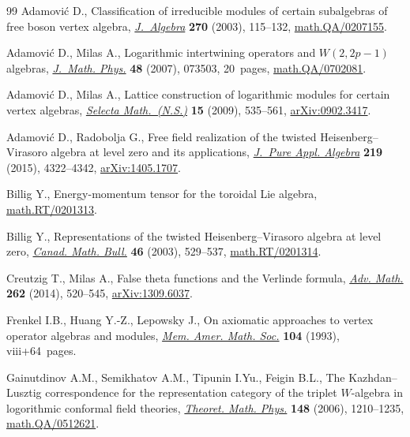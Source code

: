 \documentclass[11pt]{article}
\numberwithin{equation}{section}
\begin{document}
\begin{thebibliography}{99}
Adamovi{\'c} D., Classif\/ication of irreducible modules of certain subalgebras
 of free boson vertex algebra, \href{http://dx.doi.org/10.1016/j.jalgebra.2003.07.011}{\textit{J.~Algebra}} \textbf{270} (2003),
 115--132, \href{http://arxiv.org/abs/math.QA/0207155}{math.QA/0207155}.

Adamovi{\'c} D., Milas A., Logarithmic intertwining operators and {$W(2,2p-1)$}
 algebras, \href{http://dx.doi.org/10.1063/1.2747725}{\textit{J.~Math. Phys.}} \textbf{48} (2007), 073503, 20~pages,
 \href{http://arxiv.org/abs/math.QA/0702081}{math.QA/0702081}.

Adamovi{\'c} D., Milas A., Lattice construction of logarithmic modules for
 certain vertex algebras, \href{http://dx.doi.org/10.1007/s00029-009-0009-z}{\textit{Selecta Math.~(N.S.)}} \textbf{15} (2009),
 535--561, \href{http://arxiv.org/abs/0902.3417}{arXiv:0902.3417}.

Adamovi{\'c} D., Radobolja G., Free f\/ield realization of the twisted
 {H}eisenberg--{V}irasoro algebra at level zero and its applications,
 \href{http://dx.doi.org/10.1016/j.jpaa.2015.02.019}{\textit{J.~Pure Appl. Algebra}} \textbf{219} (2015), 4322--4342,
 \href{http://arxiv.org/abs/1405.1707}{arXiv:1405.1707}.

Billig Y., Energy-momentum tensor for the toroidal {L}ie algebra,
 \href{http://arxiv.org/abs/math.RT/0201313}{math.RT/0201313}.

Billig Y., Representations of the twisted {H}eisenberg--{V}irasoro algebra at
 level zero, \href{http://dx.doi.org/10.4153/CMB-2003-050-8}{\textit{Canad. Math. Bull.}} \textbf{46} (2003), 529--537,
 \href{http://arxiv.org/abs/math.RT/0201314}{math.RT/0201314}.

Creutzig T., Milas A., False theta functions and the {V}erlinde formula,
 \href{http://dx.doi.org/10.1016/j.aim.2014.05.018}{\textit{Adv. Math.}} \textbf{262} (2014), 520--545, \href{http://arxiv.org/abs/1309.6037}{arXiv:1309.6037}.

Frenkel I.B., Huang Y.-Z., Lepowsky J., On axiomatic approaches to vertex
 operator algebras and modules, \href{http://dx.doi.org/10.1090/memo/0494}{\textit{Mem. Amer. Math. Soc.}} \textbf{104}
 (1993), viii+64~pages.

Gainutdinov A.M., Semikhatov A.M., Tipunin I.Yu., Feigin B.L., The
 {K}azhdan--{L}usztig correspondence for the representation category of the
 triplet {$W$}-algebra in logorithmic conformal f\/ield theories,
 \href{http://dx.doi.org/10.1007/s11232-006-0113-6}{\textit{Theoret. Math. Phys.}} \textbf{148} (2006), 1210--1235,
 \href{http://arxiv.org/abs/math.QA/0512621}{math.QA/0512621}.


\end{thebibliography}
\end{document}
